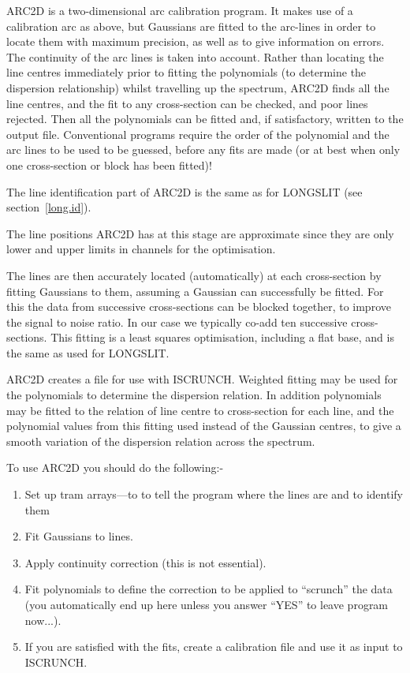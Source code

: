 ARC2D is a two-dimensional arc calibration program. It makes use of a
calibration arc as above, but Gaussians are fitted to the arc-lines in
order to locate them with maximum precision, as well as to give
information on errors. The continuity of the arc lines is taken into
account. Rather than locating the line centres immediately prior to
fitting the polynomials (to determine the dispersion relationship)
whilst travelling up the spectrum, ARC2D finds all the line centres,
and the fit to any cross-section can be checked, and poor lines
rejected. Then all the polynomials can be fitted and, if satisfactory,
written to the output file. Conventional programs require the order of
the polynomial and the arc lines to be used to be guessed, before any
fits are made (or at best when only one cross-section or block has been
fitted)!

The line identification part of ARC2D is the same as for LONGSLIT (see
section~\ref{long.id}).

The line positions ARC2D has at this stage are approximate since they
are only lower and upper limits in channels for the optimisation.

The lines are then accurately located (automatically) at each
cross-section by fitting Gaussians to them, assuming a Gaussian can
successfully be fitted. For this the data from successive
cross-sections can be blocked together, to improve the signal to noise
ratio. In our case we typically co-add ten successive cross-sections.
This fitting is a least squares optimisation, including a flat base,
and is the same as used for LONGSLIT. 

ARC2D creates a file for use with ISCRUNCH.
Weighted fitting may be used for the
polynomials to determine the dispersion relation. In addition
polynomials may be fitted to the relation of line centre to
cross-section for each line, and the polynomial values from this
fitting used instead of the Gaussian centres, to give a smooth
variation of the dispersion relation across the spectrum.

  To use ARC2D you should do the following:-

\begin{enumerate}
\item Set up tram arrays---to to tell the program where the lines are
and to identify them
\item Fit Gaussians to lines.
\item Apply continuity correction (this is not essential).
\item Fit polynomials to define the correction to be applied to
``scrunch'' the data (you automatically end up here unless you answer
``YES'' to leave program now...).
\item If you are satisfied with the fits, create a calibration file and
use it as input to ISCRUNCH.
\end{enumerate}

